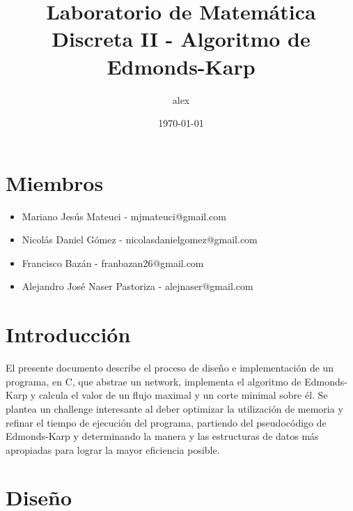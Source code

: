 \documentclass[11pt]{article}
\title{Laboratorio de Matemática Discreta II - Algoritmo de Edmonds-Karp}
\author{alex}
\date{\today}
\begin{document}
\maketitle

\setcounter{tocdepth}{3}
\tableofcontents
\vspace*{1cm}

\section{Miembros}
\label{sec-1}

\begin{itemize}
\item Mariano Jesús Mateuci - mjmateuci@gmail.com
\item Nicolás Daniel Gómez - nicolasdanielgomez@gmail.com
\item Francisco Bazán - franbazan26@gmail.com
\item Alejandro José Naser Pastoriza - alejnaser@gmail.com
\end{itemize}
\section{Introducción}
\label{sec-2}

El presente documento describe el proceso de diseño e implementación
de un programa, en C, que abstrae un network, implementa el
algoritmo de Edmonds-Karp y calcula el valor de un flujo maximal y un
corte minimal sobre él. Se plantea un challenge interesante al deber
optimizar la utilización de memoria y refinar el tiempo de ejecución
del programa, partiendo del pseudocódigo de Edmonds-Karp y determinando
la manera y las estructuras de datos más apropiadas
para lograr la mayor eficiencia posible.
\section{Diseño}
\label{sec-3}
\end{document}
